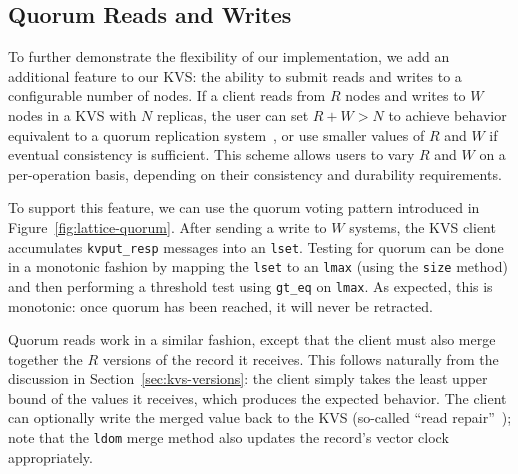 \subsection{Quorum Reads and Writes}
To further demonstrate the flexibility of our implementation, we add an
additional feature to our KVS: the ability to submit reads and writes to a
configurable number of nodes. If a client reads from $R$ nodes and writes to $W$
nodes in a KVS with $N$ replicas, the user can set $R + W > N$ to achieve
behavior equivalent to a quorum replication system~\cite{Gifford1979}, or use
smaller values of $R$ and $W$ if eventual consistency is sufficient. This scheme
allows users to vary $R$ and $W$ on a per-operation basis, depending on their
consistency and durability requirements.

To support this feature, we can use the \lang quorum voting pattern
introduced in Figure~\ref{fig:lattice-quorum}. After sending a write to $W$
systems, the KVS client accumulates \texttt{kvput\_resp} messages into an
\texttt{lset}. Testing for quorum can be done in a monotonic fashion by mapping
the \texttt{lset} to an \texttt{lmax} (using the \texttt{size} method) and then
performing a threshold test using \texttt{gt\_eq} on \texttt{lmax}. As expected,
this is monotonic: once quorum has been reached, it will never be retracted.

Quorum reads work in a similar fashion, except that the client must also merge
together the $R$ versions of the record it receives. This follows naturally from
the discussion in Section~\ref{sec:kvs-versions}: the client simply takes the
least upper bound of the values it receives, which produces the expected
behavior. The client can optionally write the merged value back to the KVS
(so-called ``read repair''~\cite{DeCandia2007}); note that the \texttt{ldom}
merge method also updates the record's vector clock appropriately.